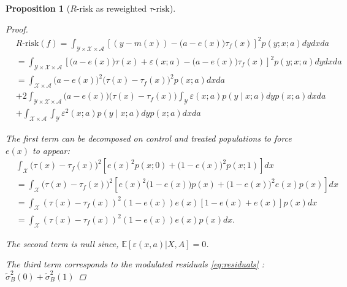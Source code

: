 \documentclass[unnumsec,webpdf,contemporary,large]{oup-authoring-template}%
\theoremstyle{thmstyleone}%
\theoremstyle{thmstyletwo}%
\theoremstyle{thmstylethree}%
\newtheorem{proposition*}{Proposition}
\begin{document}
\begin{appendices}
\begin{proposition*}[$R\text{-risk}$ as reweighted $\tau
                \text{-risk}$]
\begin{proof}
            \begin{align*}
                 & R\text {-risk}(f) =\int_{\mathcal{Y} \times \mathcal{X} \times \mathcal{A}}[(y-m(x))-\big(a-e(x)\big) \tau_f(x)]^{2} p(y ; x ; a) d y d x d a                                     \\
                 & =\int_{\mathcal{Y} \times \mathcal{X} \times \mathcal{A}} \left[\big(a-e(x)\big)\tau(x)+\varepsilon(x ; a)-\big(a-e(x)\big) \tau_f(x)\right]^{2} p(y ; x ; a) d y d x da          \\
                 & =\int_{\mathcal{X} \times \mathcal{A}}\big(a-e(x)\big)^{2}\big(\tau(x)- \tau_f(x)\big)^{2} p(x ; a) d x d a                                                                       \\
                 & + 2  \int_{\mathcal{Y} \times \mathcal{X} \times \mathcal{A}}\big(a-e(x)\big)\big(\tau(x)-\tau_f(x)\big)  \int_{\mathcal{Y}} \varepsilon(x ; a) p(y \mid x ; a) d y p(x ; a)dx da \\
                 & +\int_{\mathcal{X} \times \mathcal{A}} \int_{\mathcal{Y}} \varepsilon^{2}(x ; a) p(y \mid x ; a) d y p(x ; a) d x d a
            \end{align*}

            The first term can be decomposed on control and treated populations to force
            $e(x)$ to appear:
            \begin{align*}
                 & \int_{\mathcal{X}}\big(\tau(x)-\tau_f(x)\big)^{2}\left[e(x)^{2}p(x;0) + \big(1-e(x)\big)^{2} p(x;1)\right] d x                    \\
                 & =\int_{\mathcal{X}}\big(\tau(x)-\tau_f(x)\big)^{2}  \left[e(x)^{2}\big(1-e(x)\big)p(x) + \big(1-e(x)\big)^{2}e(x) p(x)\right] d x \\
                 & =\int_{\mathcal{X}}(\tau(x)-\tau_f(x))^{2}(1-e(x)) e(x)[1-e(x)+e(x)] p(x) d x                                                     \\ &=\int_{\mathcal{X}}(\tau(x)-\tau_f(x))^{2}(1-e(x)) e(x) p(x) d x.
            \end{align*}

            The second term is null since, $\mathbb E[\varepsilon(x, a) |X, A]=0$.

            The third term corresponds to the modulated residuals \ref{eq:residuals} :
            $\tilde{\sigma}_B^2(0) + \tilde{\sigma}_B^2(1)$

        \end{proof}
    \end{proposition*}


\end{appendices}
\end{document}
